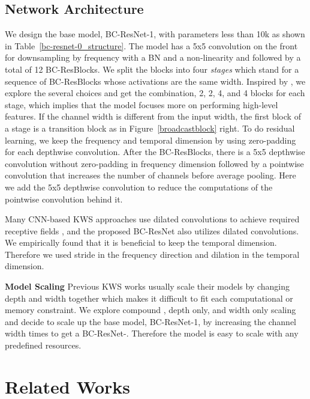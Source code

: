 \documentclass[a4paper]{article}
\begin{document}
\subsection{Network Architecture}

We design the base model, BC-ResNet-1, with parameters less than 10k as shown in Table~\ref{bc-resnet-0_structure}. The model has a 5x5 convolution on the front for downsampling by frequency with a BN and a non-linearity and followed by a total of 12 BC-ResBlocks. We split the blocks into four \textit{stages} which stand for a sequence of BC-ResBlocks whose activations are the same width. Inspired by \cite{efficientnet}, we explore the several choices and get the combination, 2, 2, 4, and 4 blocks for each stage, which implies that the model focuses more on performing high-level features. If the channel width  is different from the input width, the first block of a stage is a transition block as in Figure~\ref{broadcastblock} right. To do residual learning, we keep the frequency and temporal dimension by using zero-padding for each depthwise convolution. After the BC-ResBlocks, there is a 5x5 depthwise convolution without zero-padding in frequency dimension followed by a pointwise convolution that increases the number of channels before average pooling. Here we add the 5x5 depthwise convolution to reduce the computations of the pointwise convolution behind it.

Many CNN-based KWS approaches use dilated convolutions to achieve required receptive fields \cite{res15, ds-resnet, matchbox}, and the proposed BC-ResNet also utilizes dilated convolutions. We empirically found that it is beneficial to keep the temporal dimension. Therefore we used stride  in the frequency direction and dilation  in the temporal dimension.

\noindent \textbf{Model Scaling} Previous KWS works usually scale their models by changing depth and width together \cite{tcresnet, matchbox, tenet} which makes it difficult to fit each computational or memory constraint. We explore compound \cite{efficientnet}, depth only, and width only scaling and decide to scale up the base model, BC-ResNet-1, by increasing the channel width  times to get a BC-ResNet-. Therefore the model is easy to scale with any predefined resources.


\section{Related Works}
\end{document}
